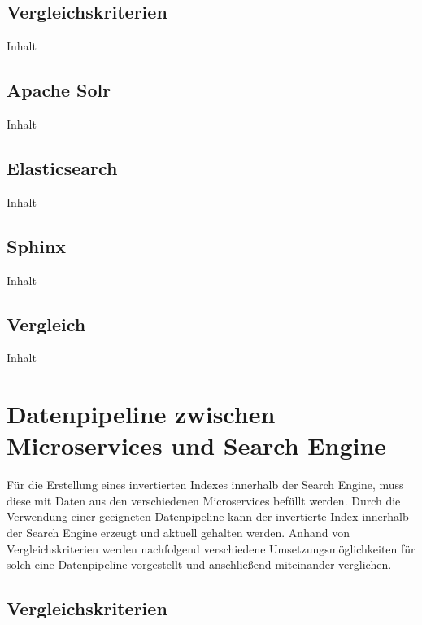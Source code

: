 \subsection{Vergleichskriterien\label{subsec4.2.1:Unterunterpunkt-1}}

Inhalt

\subsection{Apache Solr\label{subsec4.2.2:Unterunterpunkt-2}}

Inhalt

\subsection{Elasticsearch\label{subsec4.2.3:Unterunterpunkt-3}}

Inhalt

\subsection{Sphinx\label{subsec4.2.4:Unterunterpunkt-4}}

Inhalt

\subsection{Vergleich\label{subsec4.2.5:Unterunterpunkt-5}}

Inhalt

\section{Datenpipeline zwischen Microservices und Search Engine\label{sec4.3:Unterpunkt-3}}

Für die Erstellung eines invertierten Indexes innerhalb der Search Engine, muss diese mit Daten aus den verschiedenen Microservices befüllt werden. Durch die Verwendung einer geeigneten Datenpipeline kann der invertierte Index innerhalb der Search Engine erzeugt und aktuell gehalten werden. Anhand von Vergleichskriterien werden nachfolgend verschiedene Umsetzungsmöglichkeiten für solch eine Datenpipeline vorgestellt und anschließend miteinander verglichen.

\subsection{Vergleichskriterien\label{subsec4.3.1:Unterunterpunkt-1}}

